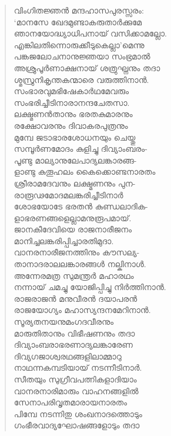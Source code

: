\begin{verse}
വിംഗിതജ്ഞന്‍ മന്ദഹാസപുരസ്സരം:\\
‘മാനസേ ഖേദമുണ്ടാകരുതാര്‍ക്കുമേ\\
ഞാനയോദ്ധ്യാധിപനായ് വസിക്കാമല്ലോ.\\
എങ്കിലതിന്നൊരുക്കീടുകെല്ലാ’മെന്നു\\
പങ്കജലോചനാനുജ്ഞയാ സംഭ്രമാല്‍\\
അശ്രുപൂര്‍ണാക്ഷനായ് ശത്രുഘ്നനും തദാ\\
ശ്മസ്രുനികൃന്തകന്മാരെ വരുത്തിനാന്‍.\\
സംഭാരവുമഭിഷേകാര്‍ഥമേവരും\\
സംഭരിച്ചീടിനാരാനന്ദചേതസാ.\\
ലക്ഷ്മണന്‍താനും ഭരതകുമാരനും\\
രക്ഷോവരനും ദിവാകരപുത്രനും\\
മുമ്പേ ജടാഭാരശോധനയും ചെയ്തു\\
സമ്പൂര്‍ണമോദം കുളിച്ചു ദിവ്യാംബരം-\\
പൂണ്ടു മാല്യാനുലേപാദ്യലങ്കാരങ്ങ-\\
ളാണ്ടു കുതൂഹലം കൈക്കൊണ്ടനാരതം\\
ശ്രീരാമദേവനും ലക്ഷ്മണനും പുന-\\
രാരൂഢമോദമലങ്കരിച്ചീടിനാര്‍\\
ശോഭയോടേ ഭരതന്‍ കുണ്ഡലാദിക-\\
ളാഭരണങ്ങളെല്ലാമനുരൂപമായ്.\\
ജാനകീദേവിയെ രാജനാരീജനം\\
മാനിച്ചലങ്കരിപ്പിച്ചാരതിമുദാ.\\
വാനരനാരീജനത്തിനും കൗസല്യ-\\
താനാദരാലലങ്കാരങ്ങള്‍ നല്കിനാള്‍.\\
അന്നേരമത്ര സുമന്ത്രര്‍ മഹാരഥം\\
നന്നായ് ചമച്ചു യോജിപ്പിച്ചു നിര്‍ത്തിനാന്‍.\\
രാജരാജന്‍ മനുവീരന്‍ ദയാപരന്‍\\
രാജയോഗ്യം മഹാസ്യന്ദനമേറിനാന്‍.\\
സൂര്യതനയനുമംഗദവീരനും\\
മാരുതിതാനും വിഭീഷണനും തദാ\\
ദിവ്യാംബരാഭരണാദ്യലങ്കാരേണ\\
ദിവ്യഗജാശ്വരഥങ്ങളിലാമ്മാറു\\
നാഥന്നകമ്പടിയായ് നടന്നീടിനാര്‍.\\
സീതയും സുഗ്രീവപത്നികളാദിയാം\\
വാനരനാരിമാരും വാഹനങ്ങളില്‍\\
സേനാപരിവൃതമാരായനാരതം\\
പിമ്പേ നടന്നിതു ശംഖനാദത്തൊടും\\
ഗംഭീരവാദ്യഘോഷങ്ങളോടും തദാ\\

\end{verse}
